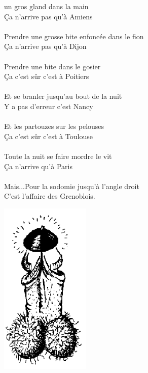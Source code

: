 
 un gros gland dans la main
\\Ça n'arrive pas qu'à Amiens
\\\\Prendre une grosse bite enfoncée dans le fion
\\Ça n'arrive pas qu'à Dijon
\\\\Prendre une bite dans le gosier
\\Ça c'est sûr c'est à Poitiers
\\\\Et se branler jusqu'au bout de la nuit
\\Y a pas d'erreur c'est Nancy
\\\\Et les partouzes sur les pelouses
\\Ça c'est sûr c'est à Toulouse
\\\\Toute la nuit se faire mordre le vit
\\Ça n'arrive qu'à Paris
\\\\Mais...Pour la sodomie jusqu'à l'angle droit
\\C'est l'affaire des Grenoblois.
\begin{center}
\includegraphics[width=0.32\textwidth]{images/gland.PNG}
\end{center}

\breakpage